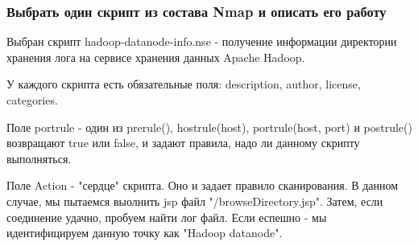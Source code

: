 \documentclass[10pt,a4paper]{article}
\begin{document}
\subsubsection{Выбрать один скрипт из состава Nmap и описать его работу}

Выбран скрипт hadoop-datanode-info.nse - получение информации директории хранения лога на сервисе хранения данных Apache Hadoop.

У каждого скрипта есть обязательные поля: description, author, license, categories.

Поле portrule - один из prerule(), hostrule(host), portrule(host, port) и postrule() возвращают true или false, и задают правила, надо ли данному скрипту выполняться. 

Поле Action - "сердце" скрипта. Оно и задает правило сканирования. В данном случае, мы пытаемся выолнить jsp файл "/browseDirectory.jsp". Затем, если соединение удачно, пробуем найти лог файл. Если еспешно - мы идентифицируем данную точку как "Hadoop datanode".
\end{document}
